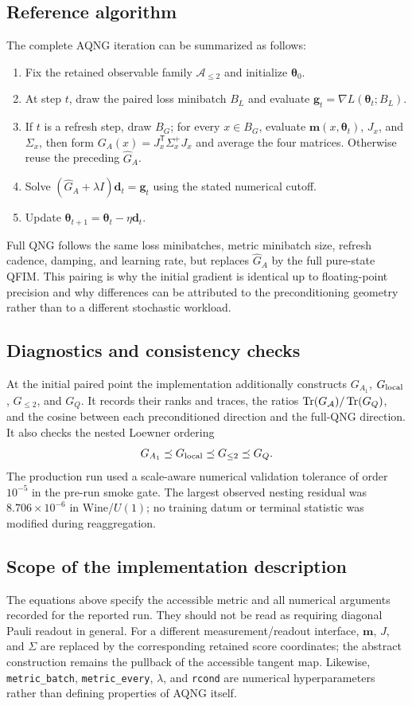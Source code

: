 \subsection{Reference algorithm}
The complete AQNG iteration can be summarized as follows:
\begin{enumerate}
 \item Fix the retained observable family $\mathcal A_{\le2}$ and initialize $\bm\theta_0$.
 \item At step $t$, draw the paired loss minibatch $B_L$ and evaluate $\bm g_t=\nabla L(\bm\theta_t;B_L)$.
 \item If $t$ is a refresh step, draw $B_G$; for every $x\in B_G$, evaluate $\bm m(x,\bm\theta_t)$, $J_x$, and $\Sigma_x$, then form $G_A(x)=J_x^{\mathsf T}\Sigma_x^+J_x$ and average the four matrices.  Otherwise reuse the preceding $\widehat G_A$.
 \item Solve $(\widehat G_A+\lambda I)\bm d_t=\bm g_t$ using the stated numerical cutoff.
 \item Update $\bm\theta_{t+1}=\bm\theta_t-\eta\bm d_t$.
\end{enumerate}
Full QNG follows the same loss minibatches, metric minibatch size, refresh cadence, damping, and learning rate, but replaces $\widehat G_A$ by the full pure-state QFIM.  This pairing is why the initial gradient is identical up to floating-point precision and why differences can be attributed to the preconditioning geometry rather than to a different stochastic workload.

\subsection{Diagnostics and consistency checks}
At the initial paired point the implementation additionally constructs $G_{A_1}$, $G_{\rm local}$, $G_{\le2}$, and $G_Q$.  It records their ranks and traces, the ratios $\operatorname{Tr}(G_{\mathcal A})/\operatorname{Tr}(G_Q)$, and the cosine between each preconditioned direction and the full-QNG direction.  It also checks the nested Loewner ordering
\begin{equation}
 G_{A_1}\preceq G_{\rm local}\preceq G_{\le2}\preceq G_Q.
\end{equation}
The production run used a scale-aware numerical validation tolerance of order $10^{-5}$ in the pre-run smoke gate.  The largest observed nesting residual was $8.706\times10^{-6}$ in Wine/$U(1)$; no training datum or terminal statistic was modified during reaggregation.

\subsection{Scope of the implementation description}
The equations above specify the accessible metric and all numerical arguments recorded for the reported run.  They should not be read as requiring diagonal Pauli readout in general.  For a different measurement/readout interface, $\bm m$, $J$, and $\Sigma$ are replaced by the corresponding retained score coordinates; the abstract construction remains the pullback of the accessible tangent map.  Likewise, \texttt{metric\_batch}, \texttt{metric\_every}, $\lambda$, and \texttt{rcond} are numerical hyperparameters rather than defining properties of AQNG itself.
